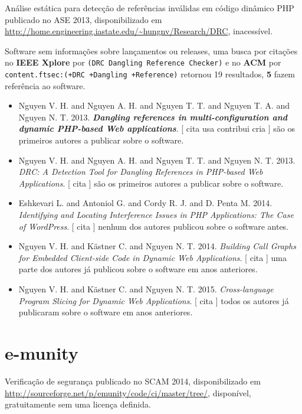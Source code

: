 Análise estática para detecção de referências inválidas em código dinâmico PHP
publicado no ASE 2013,
disponibilizado em \url{http://home.engineering.iastate.edu/~hungnv/Research/DRC},
inacessível.

Software sem informações sobre lançamentos ou releases,
uma busca por citações no {\bf IEEE Xplore} por
\texttt{(DRC Dangling Reference Checker)}
e no {\bf ACM} por
\texttt{content.ftsec:(+DRC +Dangling +Reference)}
retornou
19 resultados,
{\bf 5} fazem referência ao software.

\begin{itemize}
\item Nguyen V. H. and Nguyen A. H. and Nguyen T. T. and Nguyen T. A. and Nguyen N. T.
      2013.
        \textbf{\textit{ Dangling references in multi-configuration and dynamic PHP-based Web applications}}.
      [
          cita
          usa
          contribui
          cria
      ]
são os primeiros autores a publicar sobre o software.
\item Nguyen V. H. and Nguyen A. H. and Nguyen T. T. and Nguyen N. T.
      2013.
        \textit{ DRC: A Detection Tool for Dangling References in PHP-based Web Applications}.
      [
          cita
      ]
são os primeiros autores a publicar sobre o software.
\item Eshkevari L. and Antoniol G. and Cordy R. J. and D. Penta M.
      2014.
        \textit{ Identifying and Locating Interference Issues in PHP Applications: The Case of WordPress}.
      [
          cita
      ]
nenhum dos autores publicou sobre o software antes.
\item Nguyen V. H. and K\"{a}stner C. and Nguyen N. T.
      2014.
        \textit{ Building Call Graphs for Embedded Client-side Code in Dynamic Web Applications}.
      [
          cita
      ]
uma parte dos autores já publicou sobre o software em anos anteriores.
\item Nguyen V. H. and K\"{a}stner C. and Nguyen N. T.
      2015.
        \textit{ Cross-language Program Slicing for Dynamic Web Applications}.
      [
          cita
      ]
todos os autores já publicaram sobre o software em anos anteriores.
\end{itemize}
\section{e-munity}

Verificação de segurança
publicado no SCAM 2014,
disponibilizado em \url{http://sourceforge.net/p/emunity/code/ci/master/tree/},
disponível,
gratuitamente
sem uma licença definida.

